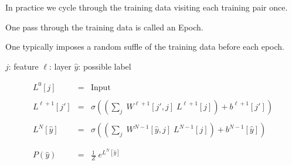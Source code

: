 {

In practice we cycle through the training data visiting each training pair once.

\vfill
One pass through the training data is called an Epoch.

\vfill
One typically imposes a random suffle of the training data before each epoch.


\centerline{$j$: feature \hfill $\ell$: layer \hfill $\hat{y}$: possible label}

\vfill
\begin{eqnarray*}
  L^0[j] & = & \mathrm{Input} \\
  \\
  L^{\ell+1}[j'] & = & \sigma\left(\left(\sum_j\;W^{\ell+1}[j',j]\;L^{\ell+1}[j]\right) + b^{\ell+1}[j']\right) \\
  \\
  L^N[\hat{y}] & = & \sigma\left(\left(\sum_j\;W^{N-1}[\hat{y},j]\;L^{N-1}[j]\right) + b^{N-1}[\hat{y}]\right) \\
  \\
  \\
  P(\hat{y}) & = & \frac{1}{Z} \;e^{L^N[\hat{y}]}
\end{eqnarray*}


}

